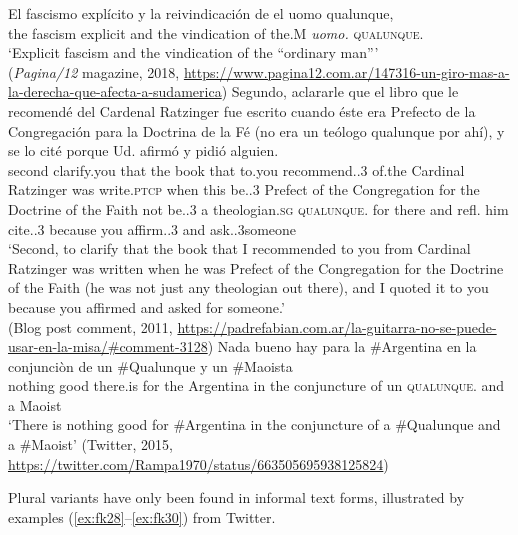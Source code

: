 \documentclass[output=paper,colorlinks,citecolor=brown]{langscibook}
\begin{document}
\ea\label{ex:fk25}
\gll El fascismo explícito y la reivindicación de 
el uomo qualunque,\\
the fascism explicit and the vindication of the.M \textit{uomo.\SG} \textsc{qualunque.\SG}\\
\glt ‘Explicit fascism and the vindication of the “ordinary man”’\\
(\textit{Pagina/12} magazine, 2018, \url{https://www.pagina12.com.ar/147316-un-giro-mas-a-la-derecha-que-afecta-a-sudamerica})
\pagebreak
\ex\label{ex:fk26}
\gll Segundo, aclararle que el libro que le recomendé del Cardenal Ratzinger fue escrito cuando éste era Prefecto de la Congregación para la Doctrina de la Fé (no era un teólogo qualunque por ahí), y se lo cité porque Ud. afirmó y pidió alguien.\\
second clarify.you that the book that to.you {recommend.\PFV.3\SG}  of.the Cardinal Ratzinger was {write.\textsc{ptcp}} when this {be.\IPFV.3\SG} Prefect of the Congregation for the Doctrine of the Faith not {be.\IPFV.3\SG} a theologian.\textsc{sg} \textsc{qualunque.\SG} for there and refl. him {cite.\PFV.3\SG} because you {affirm.\PFV.3\SG} and {ask.\PFV.3\SG}someone\\
\glt ‘Second, to clarify that the book that I recommended to you from Cardinal Ratzinger was written when he was Prefect of the Congregation for the Doctrine of the Faith (he was not just any theologian out there), and I quoted it to you because you affirmed and asked for someone.’\\
(Blog post comment, 2011, \url{https://padrefabian.com.ar/la-guitarra-no-se-puede-usar-en-la-misa/#comment-3128})
\ex\label{ex:fk27}
\gll Nada bueno hay para la \#Argentina en la conjunciòn de un \#Qualunque y un \#Maoista\\
nothing good there.is for the Argentina in the conjuncture of un \textsc{qualunque.\SG} and a Maoist\\
\glt‘There is nothing good for \#Argentina in the conjuncture of a \#Qualunque and a \#Maoist’ (Twitter, 2015, \url{https://twitter.com/Rampa1970/status/663505695938125824})
\z


Plural variants have only been found in informal text forms, illustrated by examples (\ref{ex:fk28}--\ref{ex:fk30}) from Twitter.\largerpage[2]
\end{document}
